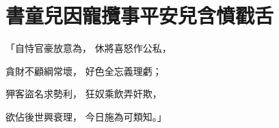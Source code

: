 %

\chapter{書童兒因寵攬事\KG 平安兒含憤戳舌}


\begin{showcontents}{}



「自恃官豪放意為，  休將喜怒作公私，

貪財不顧綱常壞，  好色全忘義理虧；

狎客盜名求勢利，  狂奴乘飲弄奸欺，

欲佔後世興衰理，  今日施為可類知。」


\end{showcontents}
